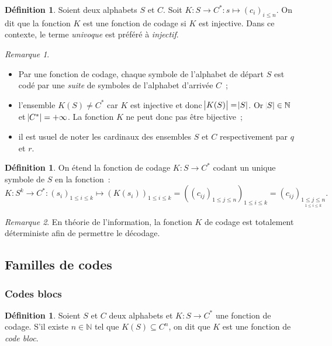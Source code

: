 \documentclass{article}
\newcommand{\N}{\mathbb N}
\theoremstyle{definition}
\newtheorem{déf}[thm]{Définition}
\theoremstyle{remark}
\newtheorem*{rmq}{Remarque}
\begin{document}
		\begin{déf} Soient deux alphabets $S$ et $C$. Soit $K : S \to C^* : s \mapsto (c_i)_{i \leq n}$. On dit que la fonction $K$ est une fonction de codage
		si $K$ est injective. Dans ce contexte, le terme \textit{univoque} est préféré à \textit{injectif}. \end{déf}

		\begin{rmq}~
		\begin{itemize}
			\item Par une fonction de codage, chaque symbole de l'alphabet de départ $S$ est codé par une \textit{suite} de symboles de l'alphabet d'arrivée $C$~;
			\item l'ensemble $K(S) \neq C^*$ car $K$ est injective et donc $\abs {K(S)}  = \abs S$. Or $\abs S \in \N$ et $\abs {C^*} = +\infty$. La fonction
			      $K$ ne peut donc pas être bijective~;
			\item il est usuel de noter les cardinaux des ensembles $S$ et $C$ respectivement par $q$ et $r$.
		\end{itemize}
		\end{rmq}

		\begin{déf} On étend la fonction de codage $K : S \to C^*$ codant un unique symbole de $S$ en la fonction~:
		\[K : S^k \to C^* : (s_i)_{1 \leq i \leq k} \mapsto \left(K(s_i)\right)_{1 \leq i \leq k} =
			\left(\left(c_{ij}\right)_{1 \leq j \leq n}\right)_{1 \leq i \leq k} = \left(c_{ij}\right)_{\underset{1 \leq i \leq k}{1 \leq j \leq n}}.\]
		\end{déf}

		\begin{rmq} En théorie de l'information, la fonction $K$ de codage est totalement déterministe afin de permettre le décodage. \end{rmq}
	
	\subsection{Familles de codes}
		\subsubsection{Codes blocs}
			\begin{déf} Soient $S$ et $C$ deux alphabets et $K : S \to C^*$ une fonction de codage. S'il existe $n \in \N$ tel que $K(S) \subseteq C^n$, on
			dit que $K$ est une fonction de \textit{code bloc}. \end{déf}
\end{document}
